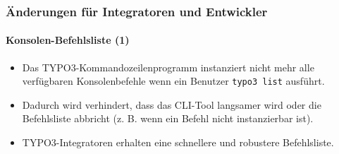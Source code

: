 %

\begin{frame}[fragile]
	\frametitle{Änderungen für Integratoren und Entwickler}
	\framesubtitle{Konsolen-Befehlsliste (1)}

	\begin{itemize}
		\item Das TYPO3-Kommandozeilenprogramm instanziert nicht mehr alle
			verfügbaren Konsolenbefehle wenn ein Benutzer \texttt{typo3 list} ausführt.
		\item Dadurch wird verhindert, dass das CLI-Tool langsamer wird 
			oder die Befehlsliste abbricht (z. B. wenn ein Befehl nicht instanzierbar ist).
		\item TYPO3-Integratoren erhalten eine schnellere und robustere Befehlsliste.
	\end{itemize}

\end{frame}

